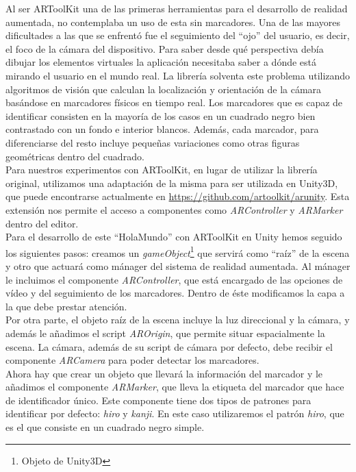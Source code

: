 Al ser ARToolKit una de las primeras herramientas para el desarrollo de realidad aumentada, no contemplaba un uso de esta sin marcadores. Una de las mayores dificultades a las que se enfrentó fue el seguimiento del “ojo” del usuario, es decir, el foco de la cámara del dispositivo. Para saber desde qué perspectiva debía dibujar los elementos virtuales la aplicación necesitaba saber a dónde está mirando el usuario en el mundo real. La librería solventa este problema utilizando algoritmos de visión que calculan la localización y orientación de la cámara basándose en marcadores físicos en tiempo real.
Los marcadores que es capaz de identificar consisten en la mayoría de los casos en un cuadrado negro bien contrastado con un fondo e interior blancos. Además, cada marcador, para diferenciarse del resto incluye pequeñas variaciones como otras figuras geométricas dentro del cuadrado.\\

Para nuestros experimentos con ARToolKit, en lugar de utilizar la librería original, utilizamos una adaptación de la misma para ser utilizada en Unity3D, que puede encontrarse actualmente en \url{https://github.com/artoolkit/arunity}. Esta extensión nos permite el acceso a componentes como \textit{ARController} y \textit{ARMarker} dentro del editor.\\

Para el desarrollo de este “HolaMundo” con ARToolKit en Unity hemos seguido los siguientes pasos: creamos un \textit{gameObject}\footnote{Objeto de Unity3D}  que servirá como “raíz” de la escena y otro que actuará como mánager del sistema de realidad aumentada. Al mánager le incluimos el componente \textit{ARController}, que está encargado de las opciones de vídeo y del seguimiento de los marcadores. Dentro de éste modificamos la capa a la que debe prestar atención. \\

Por otra parte, el objeto raíz de la escena incluye la luz direccional y la cámara, y además le añadimos el script \textit{AROrigin}, que permite situar espacialmente la escena. La cámara, además de su script de cámara por defecto, debe recibir el componente \textit{ARCamera} para poder detectar los marcadores.\\

Ahora hay que crear un objeto que llevará la información del marcador y le añadimos el componente \textit{ARMarker}, que lleva la etiqueta del marcador que hace de identificador único. Este componente tiene dos tipos de patrones para identificar por defecto: \textit{hiro} y \textit{kanji}. En este caso utilizaremos el patrón \textit{hiro}, que es el que consiste en un cuadrado negro simple.\\

